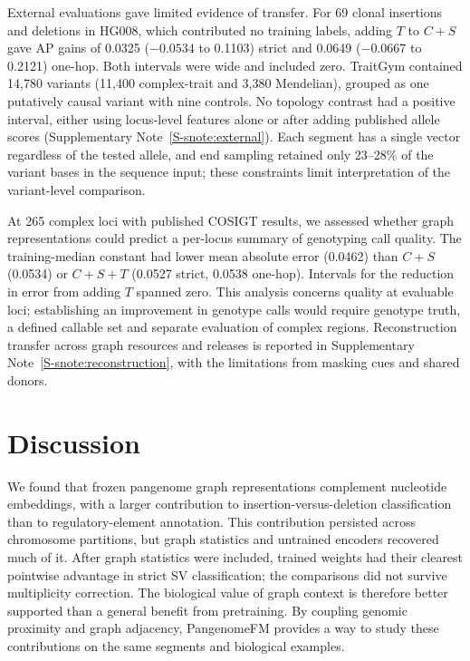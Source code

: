 \documentclass[11pt]{article}
\newcommand{\method}{PangenomeFM\xspace}
\begin{document}
\begin{bibunit}[unsrtnat]
External evaluations gave limited evidence of transfer. For 69 clonal insertions and deletions in HG008, which contributed no training labels, adding $T$ to $C+S$ gave AP gains of 0.0325 ($-0.0534$ to 0.1103) strict and 0.0649 ($-0.0667$ to 0.2121) one-hop. Both intervals were wide and included zero. TraitGym\cite{benegas2025traitgym} contained 14,780 variants (11,400 complex-trait and 3,380 Mendelian), grouped as one putatively causal variant with nine controls. No topology contrast had a positive interval, either using locus-level features alone or after adding published allele scores (Supplementary Note~\ref{S-snote:external}). Each segment has a single vector regardless of the tested allele, and end sampling retained only 23--28\% of the variant bases in the sequence input; these constraints limit interpretation of the variant-level comparison.

At 265 complex loci with published COSIGT results\cite{bolognini2026cosigt}, we assessed whether graph representations could predict a per-locus summary of genotyping call quality. The training-median constant had lower mean absolute error (0.0462) than $C+S$ (0.0534) or $C+S+T$ (0.0527 strict, 0.0538 one-hop). Intervals for the reduction in error from adding $T$ spanned zero. This analysis concerns quality at evaluable loci; establishing an improvement in genotype calls would require genotype truth, a defined callable set and separate evaluation of complex regions. Reconstruction transfer across graph resources and releases is reported in Supplementary Note~\ref{S-snote:reconstruction}, with the limitations from masking cues and shared donors.

\FloatBarrier
\section{Discussion}
\label{sec:discussion}

We found that frozen pangenome graph representations complement nucleotide embeddings, with a larger contribution to insertion-versus-deletion classification than to regulatory-element annotation. This contribution persisted across chromosome partitions, but graph statistics and untrained encoders recovered much of it. After graph statistics were included, trained weights had their clearest pointwise advantage in strict SV classification; the comparisons did not survive multiplicity correction. The biological value of graph context is therefore better supported than a general benefit from pretraining. By coupling genomic proximity and graph adjacency, \method provides a way to study these contributions on the same segments and biological examples.


\end{bibunit}
\end{document}
